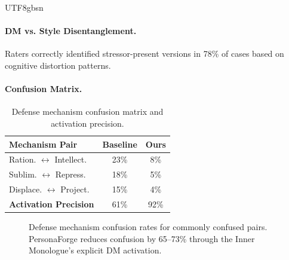 \documentclass[11pt]{article}
\begin{document}
\begin{CJK*}{UTF8}{gbsn}
\paragraph{DM vs. Style Disentanglement.} Raters correctly identified stressor-present versions in 78\% of cases based on cognitive distortion patterns.

\paragraph{Confusion Matrix.}
\begin{table}[h]
\centering
\small
\begin{tabular}{lcc}
\toprule
\textbf{Mechanism Pair} & \textbf{Baseline} & \textbf{Ours} \\
\midrule
Ration. $\leftrightarrow$ Intellect. & 23\% & 8\% \\
Sublim. $\leftrightarrow$ Repress. & 18\% & 5\% \\
Displace. $\leftrightarrow$ Project. & 15\% & 4\% \\
\midrule
\textbf{Activation Precision} & 61\% & 92\% \\
\bottomrule
\end{tabular}
\caption{Defense mechanism confusion matrix and activation precision.}
\label{tab:confusion}
\end{table}

\begin{figure}[h]
\centering
{}
\caption{Defense mechanism confusion rates for commonly confused pairs. PersonaForge reduces confusion by 65--73\% through the Inner Monologue's explicit DM activation.}
\label{fig:dm_confusion}
\end{figure}


\end{CJK*}
\end{document}
